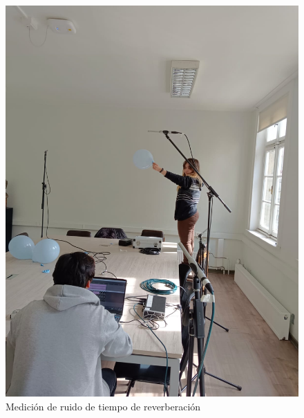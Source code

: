 \begin{figure}[H]
    \centering
    \includegraphics[scale=0.15]{Imagenes/mediciones/medicionRT.jpeg}
    \caption{Medición de ruido de tiempo de reverberación}
    \label{fig: medicionRT}
\end{figure}



